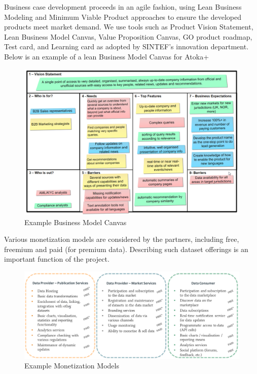 \documentclass[runningheads,a4paper]{llncs}
\makeatletter
\def\maxwidth#1{\ifdim\Gin@nat@width>#1 #1\else\Gin@nat@width\fi}
\makeatother
\begin{document}
Business case development proceeds in an agile fashion, using Lean Business Modeling and Minimum Viable Product approaches to ensure the developed products meet market demand. We use tools such as Product Vision Statement, Lean Business Model Canvas, Value Proposition Canvas, GO product roadmap, Test card, and Learning card as adopted by SINTEF's innovation department. Below is an example of a lean Business Model Canvas  \cite{_Ref491191527} for Atoka+
\begin{figure}[h!]
\centering
\includegraphics[width=\maxwidth{\textwidth}]{img/1000020100000587000003BFCD6E24D0654D050D.png}
\cprotect\caption{Example Business Model Canvas}
\label{}
\end{figure}


Various monetization models are considered by the partners, including free, freemium and paid (for premium data). Describing such dataset offerings is an important function of the project.
\begin{figure}[h!]
\centering
\includegraphics[width=\maxwidth{\textwidth}]{img/10000000000006E1000002CB881B70F373419303.png}
\cprotect\caption{Example Monetization Models}
\label{}
\end{figure}
\end{document}
